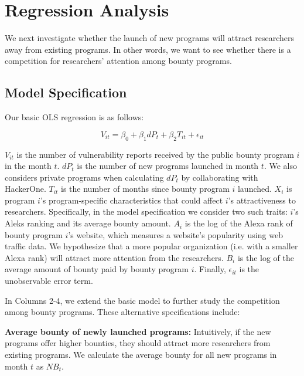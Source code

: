 


\section{Regression Analysis}

We next investigate whether the launch of new programs will attract researchers away from existing programs. In other words, we want to see whether there is a competition for researchers' attention among bounty programs.

\subsection{Model Specification}

Our basic OLS regression is as follows:

\begin{equation}
\label{reg_base}
V_{it} = \beta_0 + \beta_1 dP_t + \beta_2 T_{it} + \epsilon_{it}
\end{equation}

$V_{it}$ is the number of vulnerability reports received by the public bounty program $i$ in the month $t$. $dP_t$ is the number of new programs launched in month $t$. We also considers private programs when calculating $dP_t$ by collaborating with HackerOne.   $T_{it}$ is the number of months since bounty program $i$ launched. $X_i$ is program $i$'s program-specific characteristics that could affect $i$'s attractiveness to researchers. Specifically, in the model specification we consider two such traits: $i$'s Aleks ranking and its average bounty amount. $A_i$ is the log of the Alexa rank of bounty program $i$'s website, which measures a website's popularity using web traffic data. We hypothesize that a more popular organization (i.e. with a smaller Alexa rank) will attract more attention from the researchers. $B_i$ is the log of the average amount of bounty paid by bounty program $i$. Finally, $\epsilon_{it}$ is the unobservable error term.



In Columns 2-4, we extend the basic model to further study the competition among bounty programs. These alternative specifications include:


\textbf{Average bounty of newly launched programs:} Intuitively, if the new programs offer higher bounties, they should attract more researchers from existing programs. We calculate the average bounty for all new programs in month $t$ as $NB_t$.


